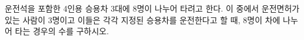 운전석을 포함한 4인용 승용차 3대에 8명이 나누어 타려고 한다. 이 중에서 운전면허가 있는 사람이 3명이고 이들은 각각 지정된 승용차를 운전한다고 할 때, 8명이 차에 나누어 타는 경우의 수를 구하시오. 
